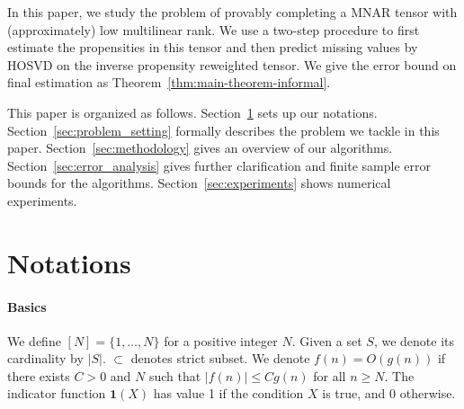 \documentclass{article}
\theoremstyle{plain}
\begin{document}
In this paper, we study the problem of provably completing a MNAR tensor with (approximately) low multilinear rank.
We use a two-step procedure to first estimate the propensities in this tensor and then predict missing values by HOSVD on the inverse propensity reweighted tensor. 
We give the error bound on final estimation as Theorem~\ref{thm:main-theorem-informal}.

This paper is organized as follows.
Section~\ref{sec:notations} sets up our notations.
Section~\ref{sec:problem_setting} formally describes the problem we tackle in this paper.
Section~\ref{sec:methodology} gives an overview of our algorithms.
Section~\ref{sec:error_analysis} gives further clarification and finite sample error bounds for the algorithms.
Section~\ref{sec:experiments} shows numerical experiments.

\section{Notations}
\label{sec:notations}
\paragraph{Basics}
We define $[N] = \{1, \ldots, N\}$ for a positive integer $N$.
Given a set $S$, we denote its cardinality by $|S|$.
$\subset$ denotes strict subset. 
We denote $f(n) = O(g(n))$ if there exists $C>0$ and $N$ such that $|f(n)| \leq C g(n)$ for all $n \geq N$. 
The indicator function $\mathbf{1}(X)$ has value 1 if the condition $X$ is true, and 0 otherwise.
\end{document}
